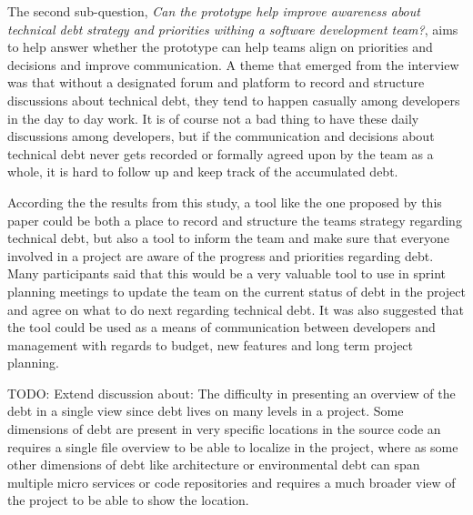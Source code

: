 The second sub-question, \textit{Can the prototype help improve awareness about technical debt strategy and priorities withing a software development team?}, aims to help answer whether the prototype can help teams align on priorities and decisions and improve communication.
A theme that emerged from the interview was that without a designated forum and platform to record and structure discussions about technical debt, they tend to happen casually among developers in the day to day work.
It is of course not a bad thing to have these daily discussions among developers, but if the communication and decisions about technical debt never gets recorded or formally agreed upon by the team as a whole, it is hard to follow up and keep track of the accumulated debt.

According the the results from this study, a tool like the one proposed by this paper could be both a place to record and structure the teams strategy regarding technical debt, but also a tool to inform the team and make sure that everyone involved in a project are aware of the progress and priorities regarding debt.
Many participants said that this would be a very valuable tool to use in sprint planning meetings to update the team on the current status of debt in the project and agree on what to do next regarding technical debt.
It was also suggested that the tool could be used as a means of communication between developers and management with regards to budget, new features and long term project planning.

TODO: Extend discussion about: The difficulty in presenting an overview of the debt in a single view since debt lives on many levels in a project. Some dimensions of debt are present in very specific locations in the source code an requires a single file overview to be able to localize in the project, where as some other dimensions of debt like architecture or environmental debt can span multiple micro services or code repositories and requires a much broader view of the project to be able to show the location.



